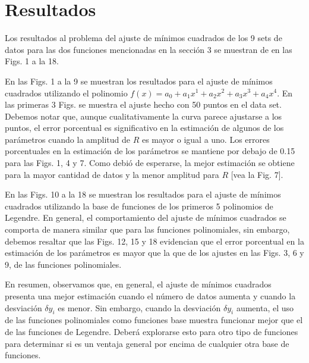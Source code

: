 \documentclass[11pt,letterpaper]{article}
\begin{document}
\section{Resultados}
Los resultados al problema del ajuste de mínimos cuadrados de los 9 sets
de datos para las dos funciones mencionadas en la sección 3 se muestran
de en las Figs. 1 a la 18. 

En las Figs. 1 a la 9 se muestran los resultados
para el ajuste de mínimos cuadrados utilizando el polinomio $f(x)=a_0
+a_1x^1+a_2x^2+a_3x^3+a_4x^4$. En las primeras 3 Figs. se muestra
el ajuste hecho con 50 puntos en el data set. Debemos notar que, aunque
cualitativamente la curva parece ajustarse a los puntos, el error porcentual
es significativo en la
estimación de algunos de los parámetros cuando la amplitud de $R$ es 
mayor o igual a uno. Los errores porcentuales en la estimación de los
parámetros se mantiene por debajo de 0.15 para las Figs. 1, 4 y 7. Como
debió de esperarse, la mejor estimación se obtiene para la mayor cantidad
de datos y la menor amplitud para $R$ [vea la Fig. 7].


En las Figs. 10 a la 18 se muestran los resultados para el ajuste de mínimos
cuadrados utilizando la base de funciones de los primeros 5 polinomios 
de Legendre. En general, el comportamiento del ajuste de mínimos cuadrados se
comporta de manera similar que para las funciones polinomiales, sin embargo,
debemos resaltar que las Figs. 12, 15 y 18 evidencian que el error porcentual
en la estimación de los parámetros es mayor que la que de los ajustes 
en las Figs. 3, 6 y 9, de las funciones polinomiales. 

En resumen, observamos que, en general, el ajuste de mínimos cuadrados
presenta una mejor estimación cuando el número de datos aumenta y cuando
la desviación $\delta y_i$ es menor. Sin embargo, cuando la desviación 
$\delta y_i$ aumenta, el uso de las funciones polinomiales como funciones 
base muestra funcionar mejor que el de las funciones de Legendre. 
Deberá explorarse esto para otro tipo de funciones para determinar si 
es un ventaja general por encima de cualquier otra base de funciones.
\end{document}
